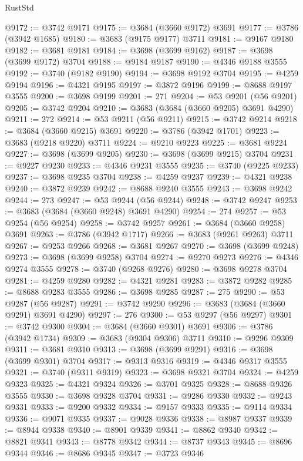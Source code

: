 \begin{lexlean}{RustStd}
\begin{coremodule}
@9172 := @3742 @9171
@9175 := @3684 (@3660 @9172) @3691
@9177 := @3786 (@3942 @1685)
@9180 := @3683 (@9175 @9177) @3711
@9181 := @9167 @9180
@9182 := @3681 @9181
@9184 := @3698 (@3699 @9162)
@9187 := @3698 (@3699 @9172) @3704
@9188 := @9184 @9187
@9190 := @4346 @9188 @3555
@9192 := @3740 (@9182 @9190)
@9194 := @3698 @9192 @3704
@9195 := @4259 @9194
@9196 := @4321 @9195
@9197 := @3872 @9196
@9199 := @8688 @9197 @3555
@9200 := @3698 @9199
@9201 := 271
@9204 := @53 @9201 (@56 @9201)
@9205 := @3742 @9204
@9210 := @3683 (@3684 (@3660 @9205) @3691 @4290)
@9211 := 272
@9214 := @53 @9211 (@56 @9211)
@9215 := @3742 @9214
@9218 := @3684 (@3660 @9215) @3691
@9220 := @3786 (@3942 @1701)
@9223 := @3683 (@9218 @9220) @3711
@9224 := @9210 @9223
@9225 := @3681 @9224
@9227 := @3698 (@3699 @9205)
@9230 := @3698 (@3699 @9215) @3704
@9231 := @9227 @9230
@9233 := @4346 @9231 @3555
@9235 := @3740 (@9225 @9233)
@9237 := @3698 @9235 @3704
@9238 := @4259 @9237
@9239 := @4321 @9238
@9240 := @3872 @9239
@9242 := @8688 @9240 @3555
@9243 := @3698 @9242
@9244 := 273
@9247 := @53 @9244 (@56 @9244)
@9248 := @3742 @9247
@9253 := @3683 (@3684 (@3660 @9248) @3691 @4290)
@9254 := 274
@9257 := @53 @9254 (@56 @9254)
@9258 := @3742 @9257
@9261 := @3684 (@3660 @9258) @3691
@9263 := @3786 (@3942 @1717)
@9266 := @3683 (@9261 @9263) @3711
@9267 := @9253 @9266
@9268 := @3681 @9267
@9270 := @3698 (@3699 @9248)
@9273 := @3698 (@3699 @9258) @3704
@9274 := @9270 @9273
@9276 := @4346 @9274 @3555
@9278 := @3740 (@9268 @9276)
@9280 := @3698 @9278 @3704
@9281 := @4259 @9280
@9282 := @4321 @9281
@9283 := @3872 @9282
@9285 := @8688 @9283 @3555
@9286 := @3698 @9285
@9287 := 275
@9290 := @53 @9287 (@56 @9287)
@9291 := @3742 @9290
@9296 := @3683 (@3684 (@3660 @9291) @3691 @4290)
@9297 := 276
@9300 := @53 @9297 (@56 @9297)
@9301 := @3742 @9300
@9304 := @3684 (@3660 @9301) @3691
@9306 := @3786 (@3942 @1734)
@9309 := @3683 (@9304 @9306) @3711
@9310 := @9296 @9309
@9311 := @3681 @9310
@9313 := @3698 (@3699 @9291)
@9316 := @3698 (@3699 @9301) @3704
@9317 := @9313 @9316
@9319 := @4346 @9317 @3555
@9321 := @3740 (@9311 @9319)
@9323 := @3698 @9321 @3704
@9324 := @4259 @9323
@9325 := @4321 @9324
@9326 := @3701 @9325
@9328 := @8688 @9326 @3555
@9330 := @3698 @9328 @3704
@9331 := @9286 @9330
@9332 := @9243 @9331
@9333 := @9200 @9332
@9334 := @9157 @9333
@9335 := @9114 @9334
@9336 := @9071 @9335
@9337 := @9028 @9336
@9338 := @8987 @9337
@9339 := @8944 @9338
@9340 := @8901 @9339
@9341 := @8862 @9340
@9342 := @8821 @9341
@9343 := @8778 @9342
@9344 := @8737 @9343
@9345 := @8696 @9344
@9346 := @8686 @9345
@9347 := @3723 @9346

\end{coremodule}
\end{lexlean}
